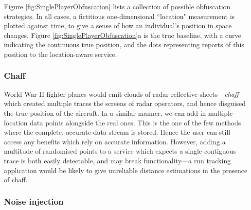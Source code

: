 \documentclass{IOS-Book-Article}     %
\begin{document}
Figure \ref{fig:SinglePlayerObfuscation} lists a collection of possible
obfuscation strategies. In all cases, a fictitious one-dimensional ``location"
measurement is plotted against time, to give a sense of how an
individual's position in space changes. Figure
\ref{fig:SinglePlayerObfuscation}a is the true baseline, with a 
curve indicating the continuous true position, and the dots
representing reports of this position to the location-aware service. 

\subsubsection{Chaff}

World War II fighter planes would emit clouds of radar reflective
sheets---\emph{chaff}---which created multiple traces the screens of radar
operators, and hence disguised the true position of the aircraft. In a similar
manner, we can add in multiple location data points alongside the real ones. This
is the one of the few methods where the complete, accurate data stream is stored.
Hence the user can still access any benefits which rely on accurate information. However,
adding a multitude of randomised points to a service which expects a single
contiguous trace is both easily detectable, and may break functionality---a
run tracking application would be likely to give unreliable distance estimations
in the presence of chaff.

\subsubsection{Noise injection}
\end{document}
